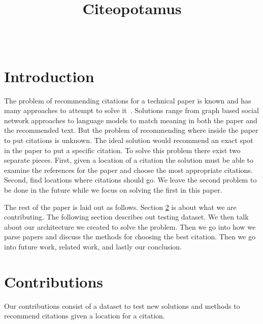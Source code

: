 \documentclass[10pt, conference, compsocconf]{IEEEtran}
\begin{document}
\title{Citeopotamus}


\author{
\\
}

\maketitle

\thispagestyle{empty}
\pagestyle{empty}

\section{Introduction}\label{sec:introduction}
The problem of recommending citations for a technical paper is known and has
many approaches to attempt to solve it~\cite{cite1, cite2, cite3, cite4, cite5,
cite6, cite7, cite8}. Solutions range from graph based social network
approaches to language models to match meaning in both the paper and the
recommended text. But the problem of recommending where inside the paper to put
citations is unknown.  The ideal solution would recommend an exact spot in the
paper to put a specific citation. To solve this problem there exist two
separate pieces. First, given a location of a citation the solution must be
able to examine the references for the paper and choose the most appropriate
citations.  Second, find locations where citations should go. We leave the
second problem to be done in the future while we focus on solving the first in
this paper.

The rest of the paper is laid out as follows. Section \ref{sec:contributions}
is about what we are contributing. The following section describes out testing
dataset. We then talk about our architecture we created to solve the problem.
Then we go into how we parse papers and discuss the methods for choosing the
best citation. Then we go into future work, related work, and lastly our
conclusion.

\section{Contributions}\label{sec:contributions}
Our contributions consist of a dataset to test new solutions and methods to
recommend citations given a location for a citation.
\end{document}
